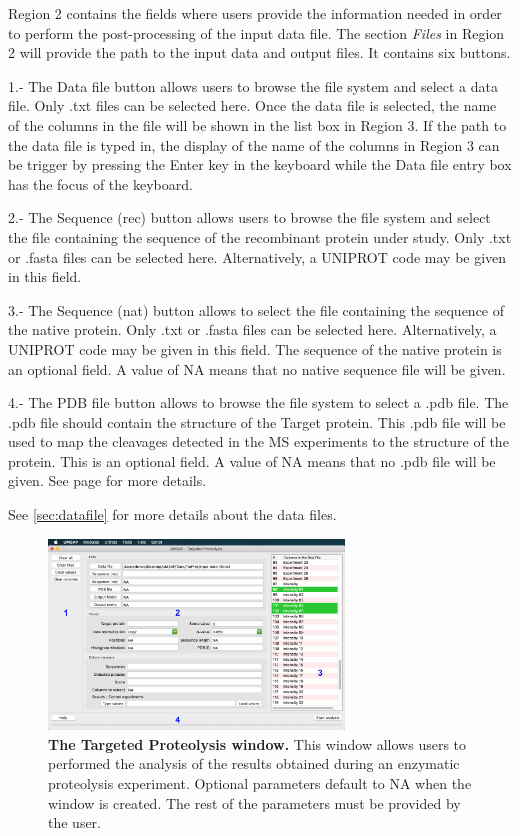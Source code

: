 Region \num{2} contains the fields where users provide the information needed in order to perform the post-processing of the input data file. The section \textit{Files} in Region \num{2} will provide the path to the input data and output files. It contains six buttons. 

\num{1}.- The Data file button allows users to browse the file system and select a data file. Only .txt files can be selected here. Once the data file is selected, the name of the columns in the file will be shown in the list box in Region \num{3}. If the path to the data file is typed in, the display of the name of the columns in Region \num{3} can be trigger by pressing the Enter key in the keyboard while the Data file entry box has the focus of the keyboard.

\num{2}.- The Sequence (rec) button allows users to browse the file system and select the file containing the sequence of the recombinant protein under study. Only .txt or .fasta files can be selected here. Alternatively,  a UNIPROT code may be given in this field.

\num{3}.- The Sequence (nat) button allows to select the file containing the sequence of the native protein. Only .txt or .fasta files can be selected here. Alternatively, a UNIPROT code may be given in this field. The sequence of the native protein is an optional field. A value of NA means that no native sequence file will be given. 

\num{4}.- The PDB file button allows to browse the file system to select a .pdb file. The .pdb file should contain the structure of the Target protein. This .pdb file will be used to map the cleavages detected in the MS experiments to the structure of the protein. This is an optional field. A value of NA means that no .pdb file will be given. See page \pageref{par:pdbID} for more details. 

See \autoref{sec:datafile} for more details about the data files.

\begin{figure}[h]
	\centering
	\includegraphics[width=0.7\textwidth]{./IMAGES/MOD-TARPROT/tarprot-mod.jpg}
	\caption[The Targeted Proteolysis window]{\textbf{The Targeted Proteolysis window.} This window allows users to performed the analysis of the results obtained during an enzymatic proteolysis experiment. Optional parameters default to NA when the window is created. The rest of the parameters must be provided by the user.} 
	\label{fig:enzdigmw}
	\vspace{-5pt} 	
\end{figure} 


